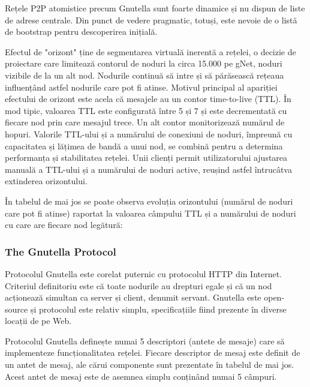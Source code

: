 Rețele P2P atomistice precum Gnutella sunt foarte dinamice și nu dispun de
liste de adrese centrale. Din punct de vedere pragmatic, totuși, este nevoie
de o listă de bootstrap pentru descoperirea inițială.

Efectul de "orizont" ține de segmentarea virtuală inerentă a rețelei, o
decizie de proiectare care limitează contorul de noduri la circa 15.000 pe
gNet, noduri vizibile de la un alt nod. Nodurile continuă să intre și să
părăsească rețeaua influențând astfel nodurile care pot fi atinse. Motivul
principal al apariției efectului de orizont este acela că mesajele au un
contor time-to-live (TTL). În mod tipic, valoarea TTL este configurată între 5
și 7 și este decrementată cu fiecare nod prin care mesajul trece. Un alt
contor monitorizează numărul de hopuri. Valorile TTL-ului și a numărului de
conexiuni de noduri, împreună cu capacitatea și lățimea de bandă a unui nod,
se combină pentru a determina performanța și stabilitatea rețelei. Unii
clienți permit utilizatorului ajustarea manuală a TTL-ului și a numărului de
noduri active, reușind astfel întrucâtva extinderea orizontului.

În tabelul de mai jos se poate observa evoluția orizontului (numărul de noduri
care pot fi atinse) raportat la valoarea câmpului TTL și a numărului de noduri
cu care are fiecare nod legătură:



\subsubsection{The Gnutella Protocol}

Protocolul Gnutella este corelat puternic cu protocolul HTTP din Internet.
Criteriul definitoriu este că toate nodurile au drepturi egale și că un nod
acționează simultan ca server și client, denumit servant. Gnutella este
open-source și protocolul este relativ simplu, specificațiile fiind prezente
în diverse locații de pe Web.

Protocolul Gnutella definește numai 5 descriptori (antete de mesaje) care să
implementeze funcționalitatea rețelei. Fiecare descriptor de mesaj este
definit de un antet de mesaj, ale cărui componente sunt prezentate în tabelul
de mai jos. Acest antet de mesaj este de asemnea simplu conținând numai 5
câmpuri.

